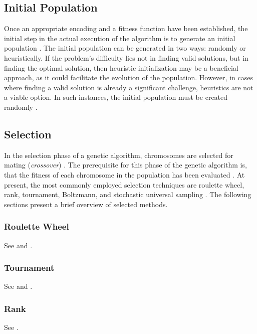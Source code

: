 \documentclass[sigconf]{acmart}
\begin{document}
\subsection{Initial Population}
Once an appropriate encoding and a fitness function have been established,
the initial step in the actual execution of the algorithm is to generate an
initial population \cite{Affenzeller2009}.
The initial population can be generated in two ways: randomly or heuristically.
If the problem's difficulty lies not in finding valid solutions, but in finding
the optimal solution, then heuristic initialization may be a beneficial
approach, as it could facilitate the evolution of the population.
However, in cases where finding a valid solution is already a significant
challenge, heuristics are not a viable option. In such instances, the initial
population must be created randomly \cite{Affenzeller2009}.

\subsection{Selection}
In the selection phase of a genetic algorithm, chromosomes are selected for
mating (\textit{crossover}) \cite{Affenzeller2009}.
The prerequisite for this phase of the genetic algorithm is, that the
fitness of each chromosome in the population has been evaluated
\cite{Affenzeller2009}.
At present, the most commonly employed selection techniques are roulette wheel,
rank, tournament, Boltzmann, and stochastic universal sampling
\cite{Katoch2021}.
The following sections present a brief overview of selected methods.

\subsubsection{Roulette Wheel}
See \cite{Affenzeller2009} and \cite{Katoch2021}.

\subsubsection{Tournament}
See \cite{Affenzeller2009} and \cite{Katoch2021}.

\subsubsection{Rank}
See \cite{Affenzeller2009}.

\end{document}
